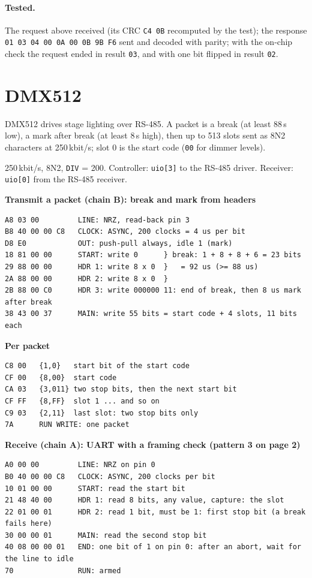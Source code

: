 \documentclass[11pt,a4paper]{article}
\newcommand{\sig}[1]{\texttt{#1}}
\newcommand{\progtitle}[1]{\par\smallskip\textbf{\small\color{accent}#1}\par\nopagebreak}
\newcommand{\facts}[1]{\par\noindent\colorbox{codebg}{\parbox{\dimexpr\linewidth-2\fboxsep}{\small #1}}\par}
\begin{document}
\paragraph{Tested.} The request above received (its CRC \texttt{C4 0B} recomputed by the test); the response \texttt{01 03 04 00 0A 00 0B 9B F6} sent and decoded with parity; with the on-chip check the request ended in result \texttt{03}, and with one bit flipped in result \texttt{02}.
\section{DMX512}
DMX512 drives stage lighting over RS-485. A packet is a break (at least 88\,\textmu s low), a mark after break (at least 8\,\textmu s high), then up to 513 slots sent as 8N2 characters at 250\,kbit/s; slot 0 is the start code (\texttt{00} for dimmer levels).
\facts{250\,kbit/s, 8N2, \sig{DIV} = 200. Controller: \sig{uio[3]} to the RS-485 driver. Receiver: \sig{uio[0]} from the RS-485 receiver.}
\progtitle{Transmit a packet (chain B): break and mark from headers}
\begin{lstlisting}
A8 03 00         LINE: NRZ, read-back pin 3
B8 40 00 00 C8   CLOCK: ASYNC, 200 clocks = 4 us per bit
D8 E0            OUT: push-pull always, idle 1 (mark)
18 81 00 00      START: write 0      } break: 1 + 8 + 8 + 6 = 23 bits
29 88 00 00      HDR 1: write 8 x 0  }   = 92 us (>= 88 us)
2A 88 00 00      HDR 2: write 8 x 0  }
2B 88 00 C0      HDR 3: write 000000 11: end of break, then 8 us mark after break
38 43 00 37      MAIN: write 55 bits = start code + 4 slots, 11 bits each
\end{lstlisting}
\progtitle{Per packet}
\begin{lstlisting}
C8 00   {1,0}   start bit of the start code
CF 00   {8,00}  start code
CA 03   {3,011} two stop bits, then the next start bit
CF FF   {8,FF}  slot 1 ... and so on
C9 03   {2,11}  last slot: two stop bits only
7A      RUN WRITE: one packet
\end{lstlisting}
\progtitle{Receive (chain A): UART with a framing check (pattern 3 on page 2)}
\begin{lstlisting}
A0 00 00         LINE: NRZ on pin 0
B0 40 00 00 C8   CLOCK: ASYNC, 200 clocks per bit
10 01 00 00      START: read the start bit
21 48 40 00      HDR 1: read 8 bits, any value, capture: the slot
22 01 00 01      HDR 2: read 1 bit, must be 1: first stop bit (a break fails here)
30 00 00 01      MAIN: read the second stop bit
40 08 00 00 01   END: one bit of 1 on pin 0: after an abort, wait for the line to idle
70               RUN: armed
\end{lstlisting}
\end{document}
